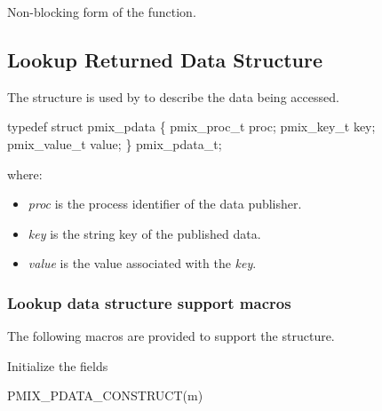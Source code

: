 \descr

Non-blocking form of the  function.


\subsection{Lookup Returned Data Structure}

The  structure is used by  to describe the data being accessed.

\cspecificstart
\begin{codepar}
typedef struct pmix_pdata \{
    pmix_proc_t proc;
    pmix_key_t key;
    pmix_value_t value;
\} pmix_pdata_t;
\end{codepar}
\cspecificend

where:
\begin{itemize}
    \item \emph{proc} is the process identifier of the data publisher.
    \item \emph{key} is the string key of the published data.
    \item \emph{value} is the value associated with the \emph{key}.
\end{itemize}


\subsubsection{Lookup data structure support macros}

The following macros are provided to support the  structure.


Initialize the  fields

\cspecificstart
\begin{codepar}
PMIX_PDATA_CONSTRUCT(m)
\end{codepar}
\cspecificend

\begin{arglist}
\end{arglist}



